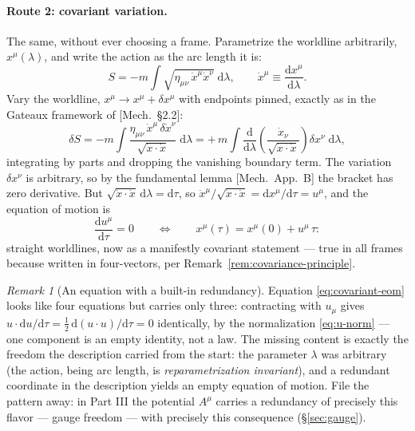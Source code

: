 \documentclass[11pt]{article}
\theoremstyle{plain}
\theoremstyle{definition}
\theoremstyle{remark}
\newtheorem{remark}[theorem]{Remark}
\newcommand{\dd}{\mathrm{d}}
\newcommand{\tot}[2]{\frac{\dd #1}{\dd #2}}
\begin{document}
\paragraph{Route 2: covariant variation.}
The same, without ever choosing a frame. Parametrize the worldline
arbitrarily, $x^\mu(\lambda)$, and write the action as the arc length
it is:
\begin{equation}
  S = -m \int \sqrt{\eta_{\mu\nu}\,
      \dot x^\mu \dot x^\nu}\;\dd\lambda,
  \qquad
  \dot x^\mu \equiv \tot{x^\mu}{\lambda}.
\end{equation}
Vary the worldline, $x^\mu \to x^\mu + \delta x^\mu$ with endpoints
pinned, exactly as in the Gateaux framework of [Mech.\ \S2.2]:
\begin{equation}
  \delta S
  = -m \int
    \frac{\eta_{\mu\nu}\,\dot x^\mu\, \delta\dot x^\nu}
         {\sqrt{\dot x \cdot \dot x}}\;
    \dd\lambda
  = +\,m \int
    \tot{}{\lambda}\!\left(
      \frac{\dot x_\nu}{\sqrt{\dot x \cdot \dot x}}
    \right) \delta x^\nu \;\dd\lambda,
\end{equation}
integrating by parts and dropping the vanishing boundary term. The
variation $\delta x^\nu$ is arbitrary, so by the fundamental lemma
[Mech.\ App.\ B] the bracket has zero derivative. But
$\sqrt{\dot x \cdot \dot x}\,\dd\lambda = \dd\tau$, so
$\dot x^\mu / \sqrt{\dot x \cdot \dot x} = \dd x^\mu/\dd\tau = u^\mu$,
and the equation of motion is
\begin{equation}
  \boxed{\;
  \tot{u^\mu}{\tau} = 0
  \qquad\Longleftrightarrow\qquad
  x^\mu(\tau) = x^\mu(0) + u^\mu\,\tau :
  \;}
  \label{eq:covariant-eom}
\end{equation}
straight worldlines, now as a manifestly covariant statement --- true
in all frames because written in four-vectors, per
Remark~\ref{rem:covariance-principle}.

\begin{remark}[An equation with a built-in redundancy]
\label{rem:reparametrization}
Equation \eqref{eq:covariant-eom} looks like four equations but
carries only three: contracting with $u_\mu$ gives
$u \cdot \dd u/\dd\tau = \tfrac12\,\dd(u\cdot u)/\dd\tau = 0$
identically, by the normalization \eqref{eq:u-norm} --- one component
is an empty identity, not a law. The missing content is exactly the
freedom the description carried from the start: the parameter
$\lambda$ was arbitrary (the action, being arc length, is
\emph{reparametrization invariant}), and a redundant coordinate in the
description yields an empty equation of motion. File the pattern away:
in Part III the potential $A^\mu$ carries a redundancy of precisely
this flavor --- gauge freedom --- with precisely this consequence
(\S\ref{sec:gauge}).
\end{remark}
\end{document}
